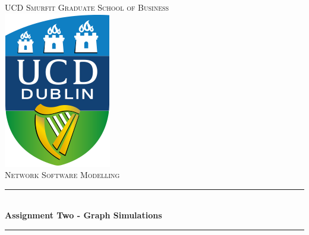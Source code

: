 \documentclass[paper=a4, fontsize=11pt]{scrartcl} %
\begin{document}
\begin{titlepage}

\newcommand{\HRule}{\rule{\linewidth}{0.5mm}} %

\center %


\textsc{\LARGE UCD Smurfit Graduate School of Business}\\[1.5cm] %
\includegraphics[scale = 0.6]{images/logo.png} \\ [1cm]
\textsc{\Large Network Software Modelling}\\[0.5cm] %


\HRule \\[0.4cm]
{ \LARGE \bfseries Assignment Two - Graph Simulations}\\[0.4cm] %
\HRule \\[1.5cm]



\end{titlepage}
\end{document}
